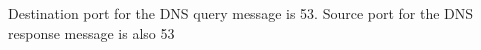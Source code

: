 Destination port for the DNS query message is 53.
\newline
Source port for the DNS response message is also 53